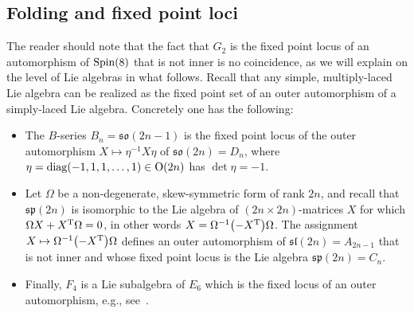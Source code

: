 \documentclass[pdftex]{sigma}
\numberwithin{equation}{section}
\begin{document}
\subsection{Folding and fixed point loci}
 The reader should note that the fact that $G_2$ is the fixed point locus of an automorphism of ${\rm Spin}(8)$ that is not inner is no coincidence, as we will explain on the level of Lie algebras in what follows. Recall that any simple, multiply-laced Lie algebra can be realized as the fixed point set of an outer automorphism of a simply-laced Lie algebra. Concretely one has the following:
 \begin{itemize}\itemsep=0pt
 \item The $B$-series $B_n = \mathfrak{so}(2n-1)$ is the fixed point locus of the outer automorphism $X \mapsto \eta^{-1} X \eta$ of $\mathfrak{so}(2n)=D_n$, where $\eta = \operatorname{diag} (-1, 1, 1, \dots, 1) \in {\rm O}(2n)$ has $\det \eta = -1$.
 \item Let $\Omega$ be a non-degenerate, skew-symmetric form of rank $2n$, and recall that $\mathfrak{sp}(2n)$ is isomorphic to the Lie algebra of $(2n \times 2n)$-matrices $X$ for which $\Omega X + X^{\rm T} \Omega = 0$, in other words $X = \Omega^{-1} \big({-}X^{\rm T}\big) \Omega$. The assignment $X \mapsto \Omega^{-1} \big({-}X^{\rm T}\big) \Omega$ defines an outer automorphism of $\mathfrak{sl}(2n) = A_{2n-1}$ that is not inner and whose fixed point locus is the Lie algebra $\mathfrak{sp}(2n) = C_n$.
 \item Finally, $F_4$ is a Lie subalgebra of $E_6$ which is the fixed locus of an outer automorphism, e.g., see~\cite[Section~3.7]{yokota}.
 \end{itemize}
\end{document}
